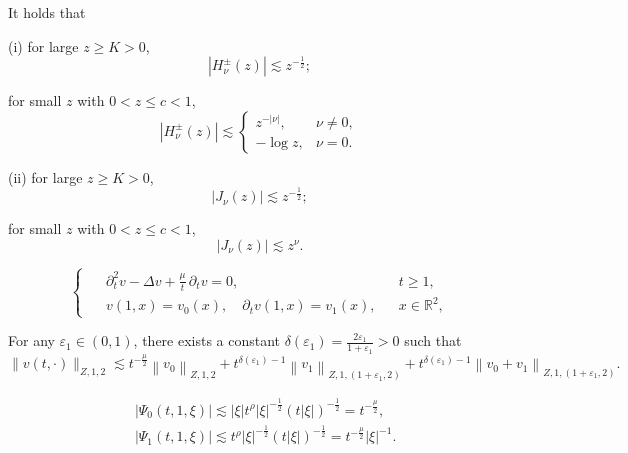 \documentclass[10pt,a4paper]{amsart}
\newcommand{\R}{\mathbb R}
\newcommand{\f}{\frac}
\newcommand{\p}{\partial}
\newcommand{\ve}{\varepsilon}
\begin{document}
\begin{lemma}\label{lem1}
It holds that

(i) for large $z\geq K > 0$,
\begin{equation}\label{equ:q12}
|H_{\nu}^{\pm}(z)|\lesssim z^{-\f{1}{2}};
\end{equation}

for small $z$ with $0<z\leq c<1$,
\begin{equation}\label{equ:q13}
\left|H_{\nu}^{ \pm}(z)\right| \lesssim \begin{cases}z^{-|\nu|}, & \nu \neq 0, \\
-\log z, & \nu=0.
\end{cases}
\end{equation}

(ii) for large $z\geq K > 0$,
\begin{equation}\label{equ:q14}
|J_{\nu}(z)|\lesssim z^{-\f{1}{2}};
\end{equation}

for small $z$ with $0<z\leq c<1$,
\begin{equation}\label{equ:q15}
|J_{\nu}(z)|\lesssim z^{\nu}.
\end{equation}
\end{lemma}

\begin{equation}\label{equ:q16}
\left\{ \enspace
\begin{aligned}
&\partial_t^2 v-\Delta v +\f{\mu}{t}\,\p_tv=0, &&
t\geq 1,\\
&v(1,x)=v_0(x), \quad \partial_{t} v(1,x)=v_1(x), &&x\in\R^2,
\end{aligned}
\right.
\end{equation}

\begin{lemma}\label{lem2}
For any $\varepsilon_1\in(0, 1)$, there exists a constant $\delta(\varepsilon_1)=\f{2\ve_1}{1+\varepsilon_1}>0$ such that
\begin{equation}\label{equ:q17}
\|v(t, \cdot)\|_{Z, 1, 2} \lesssim t^{-\f{\mu}{2}}\left\|v_0\right\|_{Z, 1, 2}
+t^{\delta(\varepsilon_1)-1}\left\|v_1\right\|_{Z, 1,(1+\varepsilon_1, 2)}
+t^{\delta(\varepsilon_1)-1}\left\|v_0+v_1\right\|_{Z, 1,(1+\varepsilon_1, 2)}.
\end{equation}
\end{lemma}

\begin{equation}\label{equ:q20}
\begin{aligned}
& \left|\Psi_0(t, 1,\xi)\right| \lesssim|\xi| t^\rho|\xi|^{-\frac{1}{2}}(t|\xi|)^{-\frac{1}{2}}=t^{-\frac{\mu}{2}}, \\
& \left|\Psi_1(t, 1, \xi)\right|  \lesssim t^\rho|\xi|^{-\frac{1}{2}}(t|\xi|)^{-\frac{1}{2}}=t^{-\frac{\mu}{2}}|\xi|^{-1}.
\end{aligned}
\end{equation}
\end{document}
